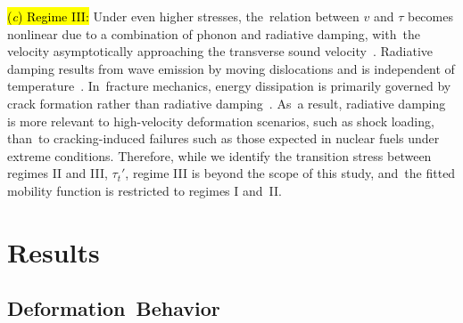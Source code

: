 \documentclass[applsci,article,accept,pdftex,moreauthors]{Definitions/mdpi}
\newcommand{\?}{\stackrel{?}{=}}
\begin{document}
\hl{(\textit{c}) Regime III:} Under even higher stresses, the~relation between $v$ and $\tau$ becomes nonlinear due to a combination of phonon and radiative damping, with~the velocity asymptotically approaching the transverse sound velocity~\cite{Dang2019}. Radiative damping results from wave emission by moving dislocations and is independent of temperature~\cite{Kresse2004}. In~fracture mechanics, energy dissipation is primarily governed by crack formation rather than radiative damping~\cite{Kresse2004}. As~a result, radiative damping is more relevant to high-velocity deformation scenarios, such as shock loading, than~to cracking-induced failures such as those expected in nuclear fuels under extreme conditions. Therefore, while we identify the transition stress between regimes II and III, $\tau_t'$, regime III is beyond the scope of this study, and~the fitted mobility function is restricted to regimes I and~II.



\section{Results}

\subsection{Deformation~Behavior}
\label{Sec:SS}
\end{document}
